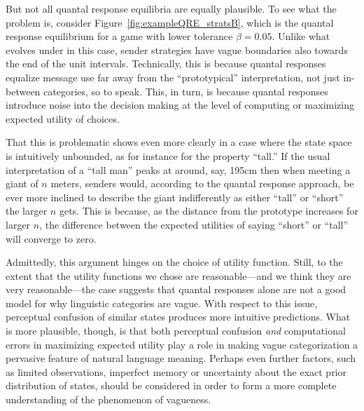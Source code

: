 \documentclass[fleqn,reqno,10pt]{article}
\newcommand{\rdd}{\acro{rdd}} %
\newcommand{\toler}{\ensuremath{\beta}} %
\begin{document}
But not all quantal response equilibria are equally plausible.
To see what the problem is, consider
Figure~\ref{fig:exampleQRE_stratsB}, which is the quantal response
equilibrium for a game with lower tolerance $\toler = 0.05$. Unlike
what evolves under \rdd in this case, sender strategies have vague
boundaries also towards the end of the unit intervals. Technically,
this is because quantal responses equalize message use far away from
the ``prototypical'' interpretation, not just in-between categories,
so to speak. This, in turn, is because quantal responses introduce
noise into the decision making at the level of computing or maximizing
expected utility of choices.

That this is problematic shows even more clearly in a case where
the state space is intuitively unbounded, as for instance for the
property ``tall.'' If the usual interpretation of a ``tall man'' peaks
at around, say, 195cm then when meeting a giant of $n$ meters, senders
would, according to the quantal response approach, be ever more
inclined to describe the giant indifferently as either ``tall'' or
``short'' the larger $n$ gets. This is because, as the distance from
the prototype increases for larger $n$, the difference between the
expected utilities of saying ``short'' or ``tall'' will converge to
zero. 

Admittedly, this argument hinges on the choice of utility
function. Still, to the extent that the utility functions we chose are
reasonable---and we think they are very reasonable---the case suggests
that quantal responses alone are not a good model for why linguistic
categories are vague. With respect to this issue, perceptual confusion
of similar states produces more intuitive predictions. What is more
plausible, though, is that both perceptual confusion \emph{and}
computational errors in maximizing expected utility play a role in
making vague categorization a pervasive feature of natural language
meaning. Perhaps even further factors, such as limited observations,
imperfect memory or uncertainty about the exact prior distribution of
states, should be considered in order to form a more complete
understanding of the phenomenon of vagueness.
\end{document}
